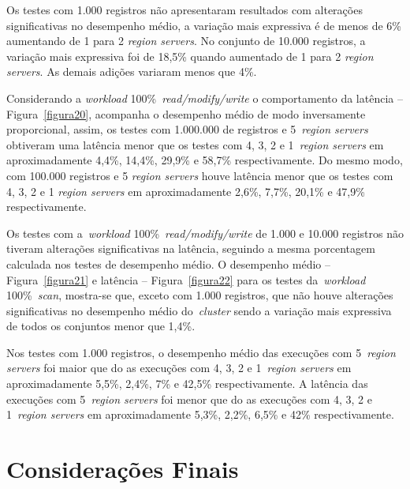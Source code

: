 \documentclass[12pt]{article}
\begin{document}
Os testes com 1.000 registros não apresentaram resultados com alterações significativas no desempenho médio, a variação mais expressiva é de menos de 6\% aumentando de 1 para 2 \emph{region servers}. No conjunto de 10.000 registros, a variação mais expressiva foi de 18,5\% quando aumentado de 1 para 2 \emph{region servers}. As demais adições variaram menos que 4\%.

Considerando a \emph{workload} 100\%~\emph{read/modify/write} o comportamento da latência -- Figura~\ref{figura20}, acompanha o desempenho médio de modo inversamente proporcional, assim, os testes com 1.000.000 de registros e 5~\emph{region servers} obtiveram uma latência menor que os testes com 4, 3, 2 e 1~\emph{region servers} em aproximadamente 4,4\%, 14,4\%, 29,9\% e 58,7\% respectivamente. Do mesmo modo, com 100.000 registros e 5 \emph{region servers} houve latência menor que os testes com 4, 3, 2 e 1 \emph{region servers} em aproximadamente 2,6\%, 7,7\%, 20,1\% e 47,9\% respectivamente.

Os testes com a~\emph{workload} 100\%~\emph{read/modify/write} de 1.000 e 10.000 registros não tiveram alterações significativas na latência, seguindo a mesma porcentagem calculada nos testes de desempenho médio. O desempenho médio -- Figura~\ref{figura21} e latência -- Figura~\ref{figura22} para os testes da~\emph{workload} 100\%~\emph{scan}, mostra-se que, exceto com 1.000 registros, que não houve alterações significativas no desempenho médio do~\emph{cluster} sendo a variação mais expressiva de todos os conjuntos menor que 1,4\%. 

Nos testes com 1.000 registros, o desempenho médio das execuções com 5~\emph{region servers} foi maior que do as execuções com 4, 3, 2 e 1~\emph{region servers} em aproximadamente 5,5\%, 2,4\%, 7\% e 42,5\% respectivamente. A latência das execuções com 5~\emph{region servers} foi menor que do as execuções com 4, 3, 2 e 1~\emph{region servers} em aproximadamente 5,3\%, 2,2\%, 6,5\% e 42\% respectivamente.

\section{Considerações Finais}
\label{sec:finais}

\end{document}
